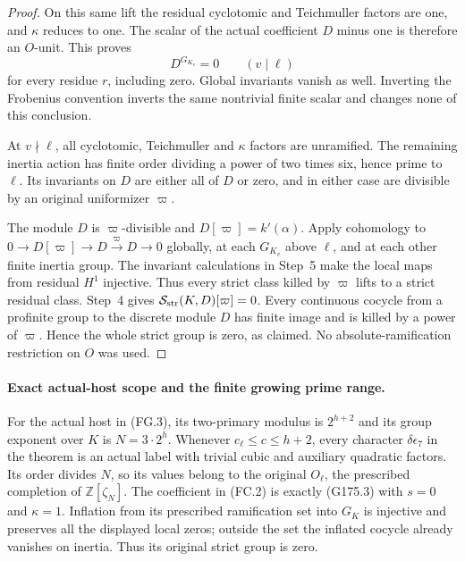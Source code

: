 \begin{proof}
On this same lift the residual cyclotomic and Teichmuller factors
are one, and $\kappa$ reduces to one.  The scalar of the actual
coefficient $D$ minus one is therefore an $O$-unit.  This proves
\[
                         D^{G_{K_v}}=0\qquad(v\mid\ell)
 \tag{G175.24}
\]
for every residue $r$, including zero.  Global invariants vanish
as well.  Inverting the Frobenius convention inverts the same
nontrivial finite scalar and changes none of this conclusion.

At $v\nmid\ell$, all cyclotomic, Teichmuller and $\kappa$ factors
are unramified.  The remaining inertia action has finite order
dividing a power of two times six, hence prime to $\ell$.
Its invariants on $D$ are either all of $D$ or zero, and in
either case are divisible by an original uniformizer $\varpi$.

The module $D$ is $\varpi$-divisible and
$D[\varpi]=k'(\alpha)$.
Apply cohomology to
$0\to D[\varpi]\to D\xrightarrow{\varpi}D\to0$
globally, at each $G_{K_v}$ above $\ell$, and at each other
finite inertia group.  The invariant calculations in Step~5
make the local maps from residual $H^1$ injective.
Thus every strict class killed by $\varpi$ lifts to a strict
residual class.  Step~4 gives
$\mathcal S_{\rm str}(K,D)[\varpi]=0$.
Every continuous cocycle from a profinite group to the discrete
module $D$ has finite image and is killed by a power of
$\varpi$.  Hence the whole strict group is zero, as claimed.
No absolute-ramification restriction on $O$ was used.
\end{proof}

\paragraph{Exact actual-host scope and the finite growing prime range.}
For the actual host in (FG.3), its two-primary modulus is
$2^{h+2}$ and its group exponent over $K$ is $N=3\cdot2^h$.
Whenever $c_\ell\leq c\leq h+2$, every character
$\delta\epsilon_7$ in the theorem is an actual label with
trivial cubic and auxiliary quadratic factors.
Its order divides $N$, so its values belong to the original
$O_\ell$, the prescribed completion of $\mathbb Z[\zeta_N]$.
The coefficient in (FC.2) is exactly (G175.3) with $s=0$ and
$\kappa=1$.  Inflation from its prescribed ramification set into
$G_K$ is injective and preserves all the displayed local zeros;
outside the set the inflated cocycle already vanishes on inertia.
Thus its original strict group is zero.

